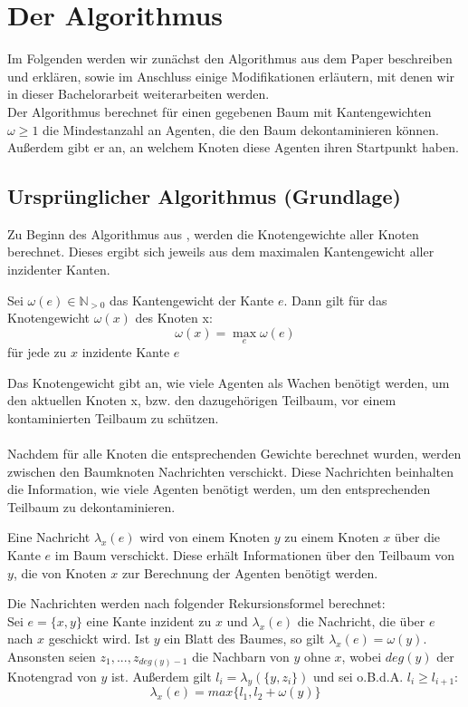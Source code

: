 \section{Der Algorithmus}\label{kap_algorithmus}
Im Folgenden werden wir zunächst den Algorithmus aus dem Paper \cite{cima_paper} beschreiben und erklären, sowie im Anschluss einige Modifikationen erläutern, mit denen wir in dieser Bachelorarbeit weiterarbeiten werden.\\
Der Algorithmus berechnet für einen gegebenen Baum mit Kantengewichten $\omega \geq 1$ die Mindestanzahl an Agenten, die den Baum dekontaminieren können. Außerdem gibt er an, an welchem Knoten diese Agenten ihren Startpunkt haben.


\subsection{Ursprünglicher Algorithmus (Grundlage)}\label{paperAlgoChapter}

Zu Beginn des Algorithmus aus \cite{cima_paper}, werden die Knotengewichte aller Knoten berechnet. Dieses ergibt sich jeweils aus dem maximalen Kantengewicht aller inzidenter Kanten. 

\begin{mydef}
	Sei $\omega(e) \in \mathbb N_{> 0}$ das Kantengewicht der Kante $e$. Dann gilt für das Knotengewicht $\omega(x)$ des Knoten x:   $$\omega(x) = \max_{e} \omega(e)$$ für jede zu $x$ inzidente Kante $e$
\end{mydef}

Das Knotengewicht gibt an, wie viele Agenten als Wachen benötigt werden, um den aktuellen Knoten x, bzw. den dazugehörigen Teilbaum, vor einem kontaminierten Teilbaum zu schützen.
\\
\\
Nachdem für alle Knoten die entsprechenden Gewichte berechnet wurden, werden zwischen den Baumknoten Nachrichten verschickt. Diese Nachrichten beinhalten die Information, wie viele Agenten benötigt werden, um den entsprechenden Teilbaum zu dekontaminieren.  

\begin{mydef}\label{def_nachricht}
	Eine Nachricht $\lambda_{x}(e)$ wird von einem Knoten $y$ zu einem Knoten $x$ über die Kante $e$ im Baum verschickt. Diese erhält Informationen über den Teilbaum von $y$, die von Knoten $x$ zur Berechnung der Agenten benötigt werden.
\end{mydef}

Die Nachrichten werden nach folgender Rekursionsformel \cite{cima_paper} berechnet:\\
Sei $e = \{x, y\}$ eine Kante inzident zu $x$ und $\lambda_{x}(e)$ die Nachricht, die über $e$ nach $x$ geschickt wird. Ist $y$ ein Blatt des Baumes, so gilt $\lambda_{x}(e) = \omega(y)$. Ansonsten seien $z_{1}, ..., z_{deg(y)-1}$ die Nachbarn von $y$ ohne $x$, wobei $deg(y)$ der Knotengrad von $y$ ist.  Außerdem gilt $l_{i} = \lambda_{y}(\{y, z_{i}\})$ und sei o.B.d.A. $l_{i} \geq l_{i+1}$: $$\lambda_{x}(e) = max \{l_{1}, l_{2} + \omega(y)\}$$


